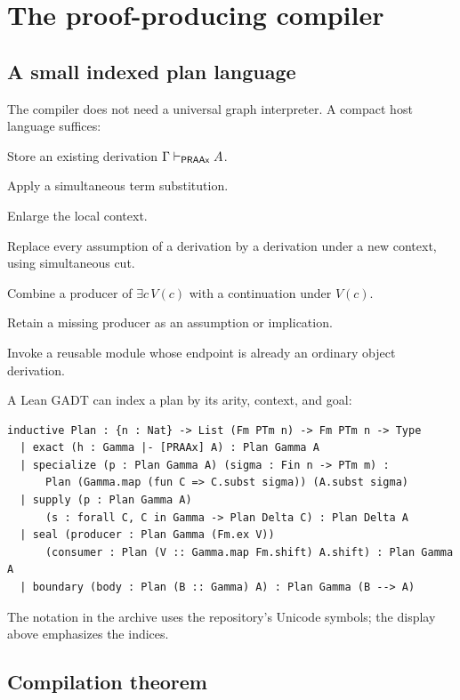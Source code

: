 \section{The proof-producing compiler}
\label{sec:compiler}

\subsection{A small indexed plan language}

The compiler does not need a universal graph interpreter.  A compact host
language suffices:

\begin{description}[leftmargin=3.0cm]
\item[Exact.] Store an existing derivation \(\Gamma\mathrel{\vdash_{\mathsf{PRAAx}}} A\).
\item[Specialize.] Apply a simultaneous term substitution.
\item[Weaken.] Enlarge the local context.
\item[Supply.] Replace every assumption of a derivation by a derivation under a
  new context, using simultaneous cut.
\item[Seal.] Combine a producer of \(\exists c\,V(c)\) with a continuation under
  \(V(c)\).
\item[Boundary.] Retain a missing producer as an assumption or implication.
\item[Reflect/search/trace.] Invoke a reusable module whose endpoint is already
  an ordinary object derivation.
\end{description}

A Lean GADT can index a plan by its arity, context, and goal:

\begin{lstlisting}
inductive Plan : {n : Nat} -> List (Fm PTm n) -> Fm PTm n -> Type
  | exact (h : Gamma |- [PRAAx] A) : Plan Gamma A
  | specialize (p : Plan Gamma A) (sigma : Fin n -> PTm m) :
      Plan (Gamma.map (fun C => C.subst sigma)) (A.subst sigma)
  | supply (p : Plan Gamma A)
      (s : forall C, C in Gamma -> Plan Delta C) : Plan Delta A
  | seal (producer : Plan Gamma (Fm.ex V))
      (consumer : Plan (V :: Gamma.map Fm.shift) A.shift) : Plan Gamma A
  | boundary (body : Plan (B :: Gamma) A) : Plan Gamma (B --> A)
\end{lstlisting}

The notation in the archive uses the repository's Unicode symbols; the display
above emphasizes the indices.

\subsection{Compilation theorem}

